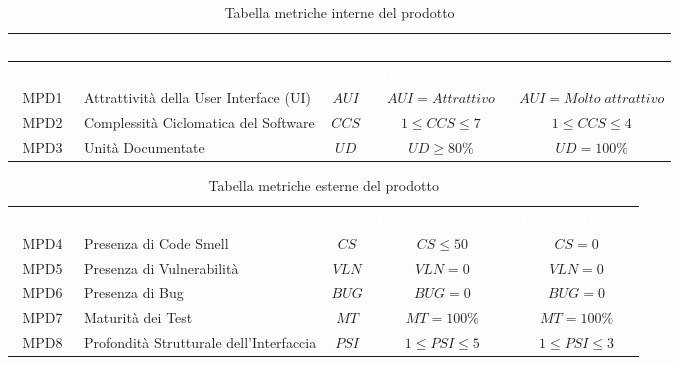 \renewcommand{\arraystretch}{1.5}
\begin{longtable}{ c C{4cm} c c c}
\caption{Tabella metriche interne del prodotto}\\
\textcolor{white}{\textbf{Metrica}} & \textcolor{white}{\textbf{Nome}} & \textcolor{white}{\textbf{Sigla}} & \textcolor{white}{\textbf{Range Accettabile}} & \textcolor{white}{\textbf{Range Ottimale}}\\
\endfirsthead
{}
\textcolor{white}{\textbf{Metrica}} & \textcolor{white}{\textbf{Nome}} & \textcolor{white}{\textbf{Sigla}} & \textcolor{white}{\textbf{Range Accettabile}} & \textcolor{white}{\textbf{Range Ottimale}}\\
\endhead
    MPD1 & Attrattività della User Interface (UI) & $AUI$ & $AUI = Attrattivo$ &  $AUI = Molto \; attrattivo$\\
    MPD2 & Complessità Ciclomatica del Software & $CCS $ & $1 \leq CCS \leq 7 $ & $1 \leq CCS \leq 4$\\
    MPD3 & Unità Documentate & $UD$ & $UD \geq 80\%$ & $UD = 100\%$\\
\end{longtable} 
\newpage
{}
\renewcommand{\arraystretch}{1.5}
\begin{longtable}{ c C{4cm} c c c}
\caption{Tabella metriche esterne del prodotto}\\
\textcolor{white}{\textbf{Metrica}} & \textcolor{white}{\textbf{Nome}} & \textcolor{white}{\textbf{Sigla}} & \textcolor{white}{\textbf{Range Accettabile}} & \textcolor{white}{\textbf{Range Ottimale}}\\
    MPD4 & Presenza di Code Smell & $CS$ & $CS \leq 50 $ & $CS = 0 $\\
    MPD5 & Presenza di Vulnerabilità & $VLN$ & $VLN = 0$ & $VLN = 0 $\\
    MPD6 & Presenza di Bug & $BUG$ & $BUG = 0 $ & $BUG = 0 $\\
    MPD7 & Maturità dei Test & $MT$ & $MT = 100\%$ & $MT = 100\%$\\
    MPD8 & Profondità Strutturale dell'Interfaccia & $PSI$ & $1 \leq PSI \leq 5$ &$1 \leq PSI \leq 3$\\
\end{longtable}
